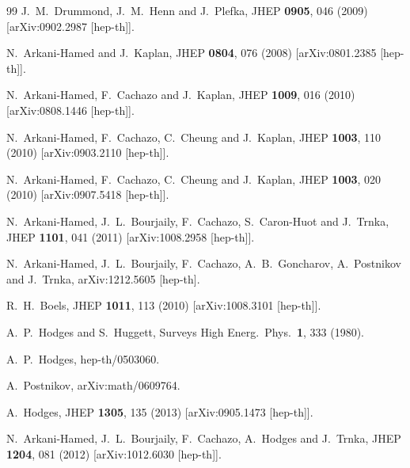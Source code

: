 \documentclass[12pt,nohyper,twosided]{JHEP3}
\begin{document}
\begin{thebibliography}{99}
  J.~M.~Drummond, J.~M.~Henn and J.~Plefka,
  JHEP {\bf 0905}, 046 (2009)
  [arXiv:0902.2987 [hep-th]].

  N.~Arkani-Hamed and J.~Kaplan,
  JHEP {\bf 0804}, 076 (2008)
  [arXiv:0801.2385 [hep-th]].

  N.~Arkani-Hamed, F.~Cachazo and J.~Kaplan,
  JHEP {\bf 1009}, 016 (2010)
  [arXiv:0808.1446 [hep-th]].

  N.~Arkani-Hamed, F.~Cachazo, C.~Cheung and J.~Kaplan,
  JHEP {\bf 1003}, 110 (2010)
  [arXiv:0903.2110 [hep-th]].

  N.~Arkani-Hamed, F.~Cachazo, C.~Cheung and J.~Kaplan,
  JHEP {\bf 1003}, 020 (2010)
  [arXiv:0907.5418 [hep-th]].

  N.~Arkani-Hamed, J.~L.~Bourjaily, F.~Cachazo, S.~Caron-Huot and J.~Trnka,
  JHEP {\bf 1101}, 041 (2011)
  [arXiv:1008.2958 [hep-th]].

  N.~Arkani-Hamed, J.~L.~Bourjaily, F.~Cachazo, A.~B.~Goncharov, A.~Postnikov and J.~Trnka,
  arXiv:1212.5605 [hep-th].

  R.~H.~Boels,
  JHEP {\bf 1011}, 113 (2010)
  [arXiv:1008.3101 [hep-th]].

  A.~P.~Hodges and S.~Huggett,
  Surveys High Energ.\ Phys.\  {\bf 1}, 333 (1980).

  A.~P.~Hodges,
  hep-th/0503060.

A.~Postnikov, arXiv:math/0609764.

  A.~Hodges,
  JHEP {\bf 1305}, 135 (2013)
  [arXiv:0905.1473 [hep-th]].

  N.~Arkani-Hamed, J.~L.~Bourjaily, F.~Cachazo, A.~Hodges and J.~Trnka,
  JHEP {\bf 1204}, 081 (2012)
  [arXiv:1012.6030 [hep-th]].


\end{thebibliography}
\end{document}
